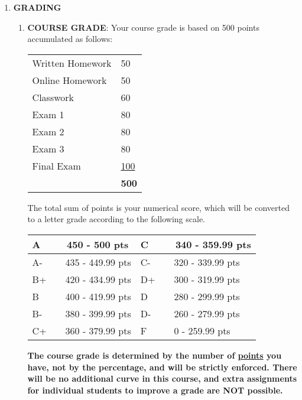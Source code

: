 \documentclass[12pt]{amsart}
\begin{document}
\begin {enumerate}
\item {\bf GRADING}

\begin {enumerate}
\item {\bf COURSE GRADE}: Your course grade is based on 500 points accumulated as follows:\\

\begin{tabular}{ll}
Written Homework & 50 \\
Online Homework & 50 \\
Classwork & 60 \\
Exam 1 & 80 \\
Exam 2 & 80 \\
Exam 3 & 80 \\
Final Exam & \underline {100} \\ 
& {\bf 500}\\
\end{tabular}

The total sum of points is your numerical score, which will be converted to a letter grade according to the following scale.\\



\begin{center}
\begin{tabular}{ |l l|l l|} 
 \hline
 A  & ~~450 - 500 pts  & C & ~~340 - 359.99 pts\\ 
\hline
 A- & ~~435 - 449.99 pts & C- & ~~320 - 339.99 pts \\ 
\hline
B+  & ~~420 - 434.99 pts & D+ & ~~300 - 319.99 pts \\
\hline
B & ~~400 - 419.99 pts & D & ~~280 - 299.99 pts \\
\hline
B- & ~~380 - 399.99 pts & D- & ~~260 - 279.99 pts \\
\hline 
C+ & ~~360 - 379.99 pts & F & ~~0 - 259.99 pts \\ 
 \hline
\end{tabular}
\end{center}


\vspace {.1in}
{\bf The course grade is determined by the number of \underline{points} you have, not by the percentage, and will be strictly enforced. There will be no additional curve in this course, and extra assignments for individual students to improve a grade are NOT possible.}\\


\end{enumerate}
\end{enumerate}
\end{document}
